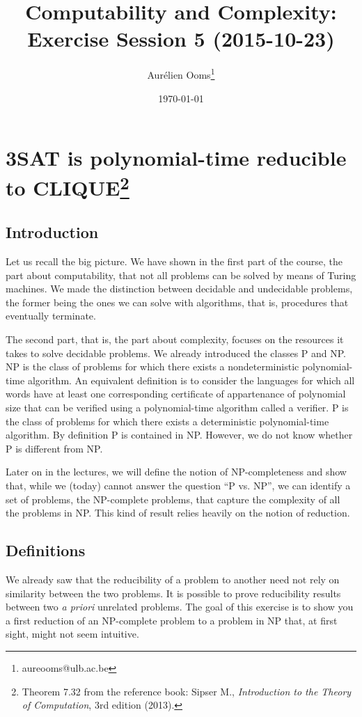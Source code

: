 \documentclass{article}
\title{Computability and Complexity:\\Exercise Session 5 (2015-10-23)}
\author{Aurélien Ooms\footnote{aureooms@ulb.ac.be}}
\date{\today}
\begin{document}
\maketitle
\tableofcontents

\section{3SAT is polynomial-time reducible to CLIQUE\footnote{%
Theorem 7.32 from the reference book: Sipser M.,
\emph{Introduction to the Theory of Computation}, 3rd edition (2013).}}

\subsection{Introduction}

Let us recall the big picture. We have shown in the first part of the course,
the part about computability, that not all problems can be solved by means of
Turing machines. We made the distinction between decidable and undecidable
problems, the former being the ones we can solve with algorithms, that is,
procedures that eventually terminate.

The second part, that is, the part about complexity, focuses on the resources
it takes to solve decidable problems. We already introduced the classes P and
NP\@. NP is the class of problems for which there exists a nondeterministic
polynomial-time algorithm. An equivalent definition is to consider the
languages for which all words have at least one corresponding certificate of
appartenance of polynomial size that can be verified using a polynomial-time
algorithm called a verifier. P is the class of problems for which there exists
a deterministic polynomial-time algorithm. By definition P is contained in NP\@.
However, we do not know whether P is different from NP.

Later on in the lectures, we will define the notion of NP-completeness and show
that, while we (today) cannot answer the question ``P vs. NP'', we can identify
a set of problems, the NP-complete problems, that capture the complexity of all
the problems in NP\@. This kind of result relies heavily on the notion of
reduction.

\subsection{Definitions}

We already saw that the reducibility of a problem to
another need not rely on similarity between the two problems. It is
possible to prove reducibility results between two \emph{a priori} unrelated problems.
The goal of this exercise is to show you a first reduction of an NP-complete
problem to a problem in NP that, at first sight, might not seem intuitive.
\end{document}
